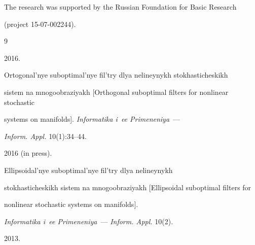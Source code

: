 





\Ack

\noindent

The research was supported by the Russian Foundation for Basic Research 

(project 15-07-002244).





\renewcommand{\bibname}{\protect\rmfamily References}




{\small\frenchspacing

{%


\begin{thebibliography}{9} 




 2016.

Ortogonal'nye suboptimal'nye fil'try dlya nelineynykh sto\-kha\-sti\-che\-skikh 

sistem na mnogoobraziyakh [Orthogonal suboptimal filters for nonlinear stochastic 

systems on manifolds]. \textit{Informatika i~ee Primeneniya}~---

\textit{Inform. Appl.} 10(1):34--44.




 2016 (in press).

Ellipsoidal'nye suboptimal'nye fil'try dlya nelineynykh 

stokhasticheskikh sistem na mnogoobraziyakh [Ellipsoidal suboptimal filters for 

nonlinear stochastic systems on manifolds].

\textit{Informatika i~ee Primeneniya}~--- \textit{Inform. Appl.} 10(2).






 2013.


\end{thebibliography}}}
